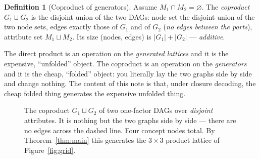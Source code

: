 \documentclass[11pt]{article}
\theoremstyle{definition}
\newtheorem{definition}{Definition}
\theoremstyle{plain}
\theoremstyle{remark}
\newcommand{\Gcoprod}{\sqcup}             %
\newcommand{\attrs}{M}
\begin{document}
\begin{definition}[Coproduct of generators]
Assume $\attrs_1\cap\attrs_2=\varnothing$. The \emph{coproduct}
$G_1\Gcoprod G_2$ is the disjoint union of the two DAGs: node set the disjoint
union of the two node sets, edges exactly those of $G_1$ and of $G_2$ (\emph{no
edges between the parts}), attribute set $\attrs_1\sqcup\attrs_2$. Its size
(nodes, edges) is $|G_1|+|G_2|$ --- \emph{additive}.
\end{definition}

The direct product is an operation on the \emph{generated lattices} and it is the
expensive, ``unfolded'' object. The coproduct is an operation on the
\emph{generators} and it is the cheap, ``folded'' object: you literally lay the
two graphs side by side and change nothing. The content of this note is that,
under closure decoding, the cheap folded thing generates the expensive unfolded
thing.

\begin{figure}[h]
\centering
{}
\caption{The coproduct $G_1\Gcoprod G_2$ of two one-factor DAGs over
\emph{disjoint} attributes. It is nothing but the two graphs side by side ---
there are no edges across the dashed line. Four concept nodes total. By
Theorem~\ref{thm:main} this generates the $3\times 3$ product lattice of
Figure~\ref{fig:grid}.}
\label{fig:coproduct}
\end{figure}
\end{document}
